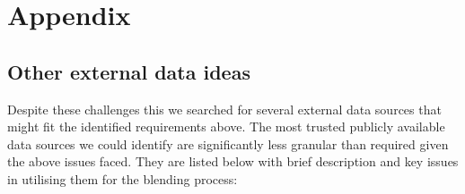 \documentclass{article}
\begin{document}
\section{Appendix}

\subsection{Other external data ideas}

Despite these challenges this we searched for several external data sources that might fit the identified requirements above. The most trusted publicly available data sources we could identify are 
significantly less granular than required given the above issues faced. They are 
listed below with brief description and key issues in utilising them 
for the blending process:
\end{document}
